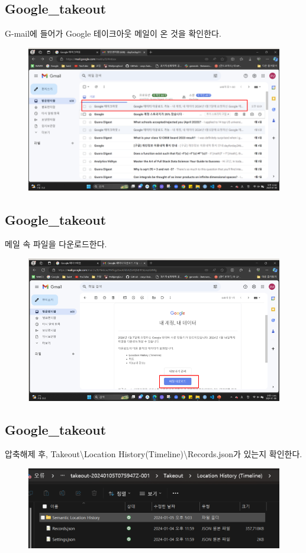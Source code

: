 \documentclass{oblivoir}
\begin{document}
  \subsection{Google\_takeout}
  G-mail에 들어가 Google 테이크아웃 메일이 온 것을 확인한다.
  \begin{figure}[H]
    \includegraphics[width=\textwidth]{Google_takeout_6.png}
  \end{figure}
  \subsection{Google\_takeout}
  메일 속 파일을 다운로드한다.
  \begin{figure}[H]
    \includegraphics[width=\textwidth]{Google_takeout_7.png}
  \end{figure}
  \subsection{Google\_takeout}
  압축해제 후, Takeout\textbackslash Location History(Timeline)\textbackslash Records.json가 있는지 확인한다.
  \begin{figure}[H]
    \includegraphics[width=\textwidth]{Google_takeout_8.png}
  \end{figure}
\end{document}
